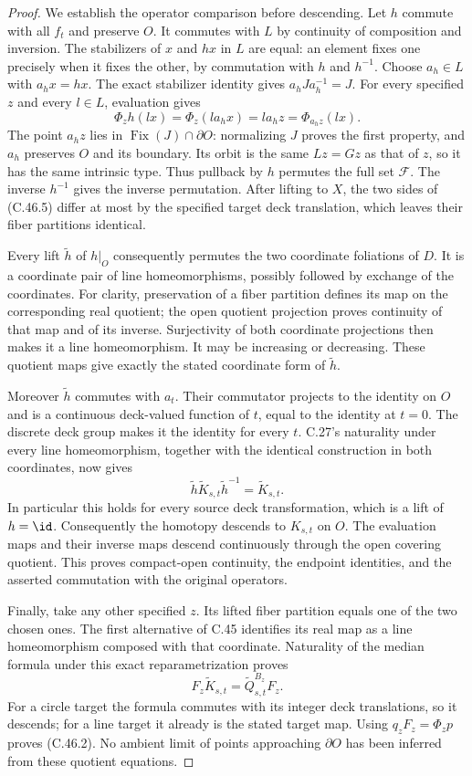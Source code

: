 \begin{proof}
We establish the operator comparison before descending.
Let $h$ commute with all $f_t$ and preserve $O$.
It commutes with $L$ by continuity of composition and
inversion. The stabilizers of $x$ and $hx$ in $L$
are equal: an element fixes one precisely when it
fixes the other, by commutation with $h$ and $h^{-1}$.
Choose $a_h\in L$ with $a_hx=hx$. The exact stabilizer
identity gives $a_hJa_h^{-1}=J$. For every specified
$z$ and every $l\in L$, evaluation gives
\[
 \Phi_z h(lx)=\Phi_z(l a_hx)=l a_hz
                         =\Phi_{a_hz}(lx).             \tag{C.46.5}
\]
The point $a_hz$ lies in $\operatorname{Fix}(J)\cap
\partial O$: normalizing $J$ proves the first property,
and $a_h$ preserves $O$ and its boundary. Its orbit
is the same $Lz=Gz$ as that of $z$, so it has the
same intrinsic type. Thus pullback by $h$ permutes
the full set $\mathscr F$. The inverse $h^{-1}$
gives the inverse permutation. After lifting to $X$,
the two sides of (C.46.5) differ at most by the
specified target deck translation, which leaves
their fiber partitions identical.

Every lift $\widetilde h$ of $h|_O$ consequently
permutes the two coordinate foliations of $D$.
It is a coordinate pair of line homeomorphisms,
possibly followed by exchange of the coordinates.
For clarity, preservation of a fiber partition
defines its map on the corresponding real quotient;
the open quotient projection proves continuity of
that map and of its inverse. Surjectivity of both
coordinate projections then makes it a line
homeomorphism. It may be increasing or decreasing.
These quotient maps give exactly the stated
coordinate form of $\widetilde h$.

Moreover $\widetilde h$ commutes with $a_t$.
Their commutator projects to the identity on $O$
and is a continuous deck-valued function of $t$,
equal to the identity at $t=0$. The discrete deck
group makes it the identity for every $t$.
C.27's naturality under every line homeomorphism,
together with the identical construction in both
coordinates, now gives
\[
      \widetilde h\widetilde K_{s,t}\widetilde h^{-1}
                           =\widetilde K_{s,t}.         \tag{C.46.6}
\]
In particular this holds for every source deck
transformation, which is a lift of $h=\id$.
Consequently the homotopy descends to $K_{s,t}$
on $O$. The evaluation maps and their inverse
maps descend continuously through the open covering
quotient. This proves compact-open continuity,
the endpoint identities, and the asserted
commutation with the original operators.

Finally, take any other specified $z$. Its lifted
fiber partition equals one of the two chosen ones.
The first alternative of C.45 identifies its real
map as a line homeomorphism composed with that
coordinate. Naturality of the median formula under
this exact reparametrization proves
\[
 F_z\widetilde K_{s,t}=\widetilde Q^{B_z}_{s,t}F_z.
\]
For a circle target the formula commutes with its
integer deck translations, so it descends; for a
line target it already is the stated target map.
Using $q_zF_z=\Phi_zp$ proves (C.46.2).
No ambient limit of points approaching $\partial O$
has been inferred from these quotient equations.
\end{proof}
